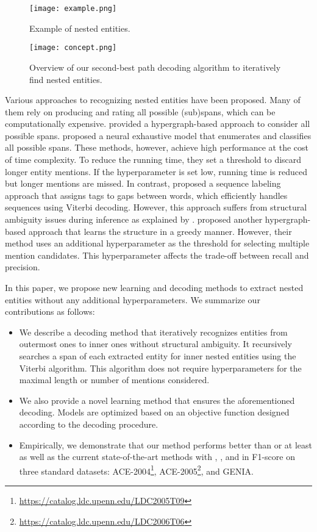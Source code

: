 \documentclass[11pt,a4paper]{article}
\begin{document}
\begin{figure}[t]
\centering
\texttt{[image: example.png]}
\caption{Example of nested entities.}
\label{fig:example}
\end{figure}

\begin{figure*}[t]
\centering
\texttt{[image: concept.png]}
\caption{Overview of our second-best path decoding algorithm to iteratively find nested entities.}
\label{fig:decoding}
\end{figure*}

Various approaches to recognizing nested entities have been proposed.
Many of them rely on producing and rating all possible (sub)spans, which can be computationally expensive.  
\citet{wang-lu-2018-neural} provided a hypergraph-based approach to consider all possible spans.
\citet{sohrab-miwa-2018-deep} proposed a neural exhaustive model that enumerates and classifies all possible spans.
These methods, however, achieve high performance at the cost of time complexity.
To reduce the running time, they set a threshold to discard longer entity mentions.
If the hyperparameter is set low, running time is reduced but longer mentions are missed.
In contrast, \citet{muis-lu-2017-labeling} proposed a sequence labeling approach that assigns tags to gaps between words, which efficiently handles sequences using Viterbi decoding.
However, this approach suffers from structural ambiguity issues during inference as explained by \citet{wang-lu-2018-neural}.
\citet{katiyar-cardie-2018-nested} proposed another hypergraph-based approach that learns the structure in a greedy manner.
However, their method uses an additional hyperparameter as the threshold for selecting multiple mention candidates.
This hyperparameter affects the trade-off between recall and precision. 

In this paper, we propose new learning and decoding methods to extract nested entities without any additional hyperparameters.
We summarize our contributions as follows:
\begin{itemize}
\item We describe a decoding method that iteratively recognizes entities from outermost ones to inner ones without structural ambiguity.
It recursively searches a span of each extracted entity for inner nested entities using the Viterbi algorithm.
This algorithm does not require hyperparameters for the maximal length or number of mentions considered.
\item We also provide a novel learning method that ensures the aforementioned decoding.
Models are optimized based on an objective function designed according to the decoding procedure.
\item Empirically, we demonstrate that our method performs better than or at least as well as the current state-of-the-art methods with , , and  in F1-score on three standard datasets: ACE-2004\footnote{\url{https://catalog.ldc.upenn.edu/LDC2005T09}}, ACE-2005\footnote{\url{https://catalog.ldc.upenn.edu/LDC2006T06}}, and GENIA.
\end{itemize}
\end{document}

